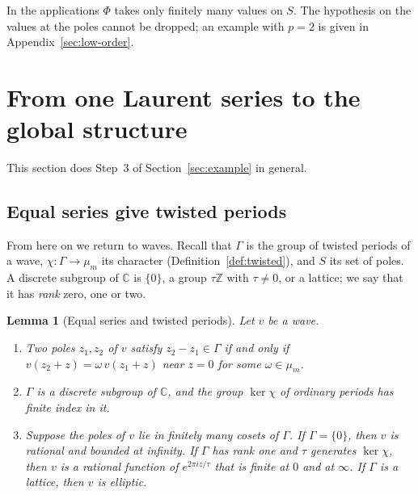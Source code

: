 \documentclass[11pt]{article}
\newtheorem{lemma}[theorem]{Lemma}
\theoremstyle{definition}
\theoremstyle{remark}
\numberwithin{equation}{section}
\newcommand{\CC}{\mathbb C}
\newcommand{\ZZ}{\mathbb Z}
\begin{document}
In the applications \(\Phi\) takes only finitely many values on \(S\).
The hypothesis on the values at the poles cannot be dropped; an example
with \(p=2\) is given in Appendix~\ref{sec:low-order}.

\section{From one Laurent series to the global structure}\label{sec:global}

This section does Step~3 of Section~\ref{sec:example} in general.

\subsection{Equal series give twisted periods}

From here on we return to waves. Recall that \(\Gamma\) is the group of
twisted periods of a wave, \(\chi\colon\Gamma\to\mu_m\) its character
(Definition~\ref{def:twisted}), and \(S\) its set of poles. A discrete
subgroup of \(\CC\) is \(\{0\}\), a group \(\tau\ZZ\) with
\(\tau\ne0\), or a lattice; we say that it has \emph{rank} zero, one or
two.

\begin{lemma}[Equal series and twisted periods]\label{lem:germs}
Let \(v\) be a wave.
\begin{enumerate}[label=\textup{(\alph*)},leftmargin=2.2em]
\item Two poles \(z_1,z_2\) of \(v\) satisfy \(z_2-z_1\in\Gamma\) if
and only if \(v(z_2+z)=\omega\,v(z_1+z)\) near \(z=0\) for some
\(\omega\in\mu_m\).
\item \(\Gamma\) is a discrete subgroup of \(\CC\), and the group
\(\ker\chi\) of ordinary periods has finite index in it.
\item Suppose the poles of \(v\) lie in finitely many cosets of
\(\Gamma\). If \(\Gamma=\{0\}\), then \(v\) is rational and bounded
at infinity. If \(\Gamma\) has rank one and \(\tau\) generates
\(\ker\chi\), then \(v\) is a rational function of
\(e^{2\pi iz/\tau}\) that is finite at \(0\) and at \(\infty\). If
\(\Gamma\) is a lattice, then \(v\) is elliptic.
\end{enumerate}
\end{lemma}
\end{document}
